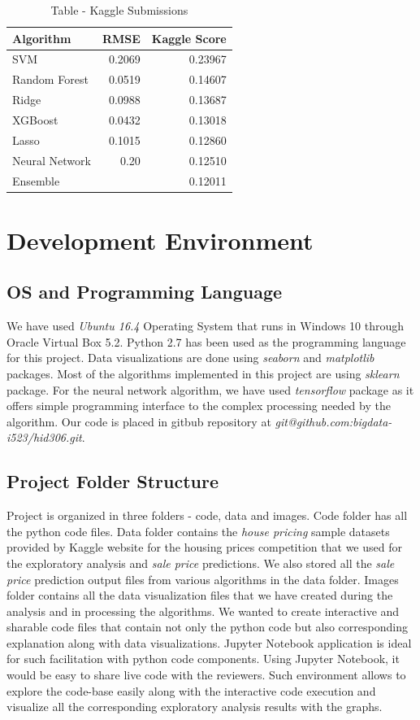 \documentclass[sigconf]{acmart}
\begin{document}
	\begin{table}[htb]
		\caption{Table - Kaggle Submissions}
		\label{tab:kaggle}		
		\begin{tabular}{lrr}
			\toprule
			Algorithm & RMSE & Kaggle Score \\
			\midrule
		    SVM &  0.2069 & 0.23967 \\
		    Random Forest &  0.0519 & 0.14607 \\
			Ridge &  0.0988 & 0.13687 \\
			XGBoost &  0.0432 & 0.13018 \\					
			Lasso &  0.1015 & 0.12860 \\
			Neural Network &  0.20 & 0.12510 \\
			Ensemble &   & 0.12011 \\
			\bottomrule
		\end{tabular}
	\end{table}

   \section{Development Environment}
    
    \subsection{OS and Programming Language}
    We have used {\em Ubuntu 16.4} Operating System that runs in Windows 10 through Oracle Virtual Box 5.2. Python 2.7  has been used as the programming language for this project. Data visualizations are done using {\em seaborn} and {\em matplotlib} packages. Most of the algorithms implemented in this project are using {\em sklearn} package. For the neural network algorithm, we have used {\em tensorflow} package as it offers simple programming interface to the complex processing needed by the algorithm. Our code is placed in gitbub repository at {\em  git@github.com:bigdata-i523/hid306.git}. 
    
    \subsection{Project Folder Structure}
    Project is organized in three folders - code, data and images. Code folder has all the python code files. Data folder contains the {\em house pricing} sample datasets provided by Kaggle website for the housing prices competition that we used for the exploratory analysis and {\em sale price} predictions. We also stored all the {\em sale price} prediction output files from various algorithms in the data folder. Images folder contains all the data visualization files that we have created during the analysis and in processing the algorithms. We wanted to create interactive and sharable code files that contain not only the python code but also corresponding explanation along with data visualizations. Jupyter Notebook application is ideal for such facilitation with python code components. Using Jupyter Notebook, it would be easy to share live code with the reviewers. Such environment allows to explore the code-base easily along with the interactive code execution and visualize all the corresponding exploratory analysis results with the graphs.
    
\end{document}
